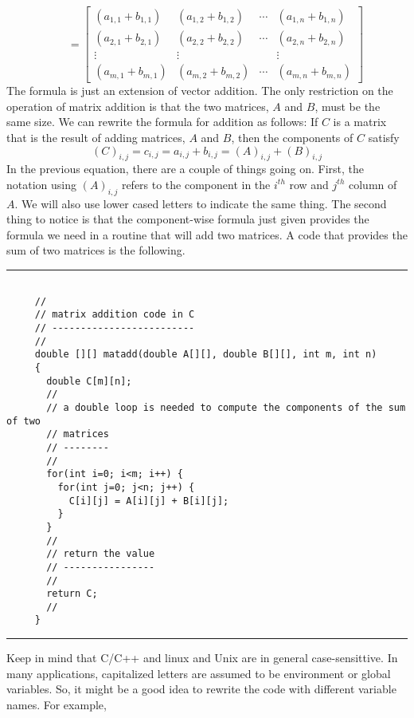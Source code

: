 \documentclass[10pt,fleqn]{article}
\begin{document}
$$
 \ \ \ \ \ \ \ 
 = \left[
     \begin{array}{cccc}
       ( a_{1,1} + b_{1,1} ) & ( a_{1,2} + b_{1,2} )
                             & \cdots & ( a_{1,n} + b_{1,n} ) \\
       ( a_{2,1} + b_{2,1} ) & ( a_{2,2} + b_{2,2} )
                             & \cdots & ( a_{2,n} + b_{2,n} ) \\
       \vdots  & \vdots  &  \ 
                         & \vdots  \\
       ( a_{m,1} + b_{m,1} ) & ( a_{m,2} + b_{m,2} )
                             & \cdots & ( a_{m,n} + b_{m,n} )
     \end{array}
   \right] 
$$
The formula is just an extension of vector addition. The only restriction on the
operation of matrix addition is that the two matrices, $A$ and $B$, must be the
same size. We can rewrite the formula for addition as follows: If $C$ is a
matrix that is the result of adding matrices, $A$ and $B$, then the components
of $C$ satisfy
$$
  (C)_{i,j} = c_{i,j} = a_{i,j} + b_{i,j} = (A)_{i,j} + (B)_{i,j}
$$
In the previous equation, there are a couple of things going on. First, the
notation using $(A)_{i,j}$ refers to the component in the $i^{th}$ row and
$j^{th}$ column of $A$. We will also use lower cased letters to indicate the
same thing. The second thing to notice is that the component-wise formula just
given provides the formula we need in a routine that will add two matrices. A
code that provides the sum of two matrices is the following.
\vskip0.1in\hrule\vskip0.1in
\begin{verbatim}

     //
     // matrix addition code in C
     // -------------------------
     //
     double [][] matadd(double A[][], double B[][], int m, int n)
     {
       double C[m][n];
       //
       // a double loop is needed to compute the components of the sum of two
       // matrices
       // --------
       //
       for(int i=0; i<m; i++) {
         for(int j=0; j<n; j++) {
           C[i][j] = A[i][j] + B[i][j];
         }
       }
       //
       // return the value
       // ----------------
       //
       return C;
       //
     }

\end{verbatim}
\vskip0.1in\hrule\vskip0.1in
\noindent
Keep in mind that C/C++ and linux and Unix are in general case-sensittive. In
many applications, capitalized letters are assumed to be environment or global
variables. So, it might be a good idea to rewrite the code with different
variable names. For example,
\end{document}
